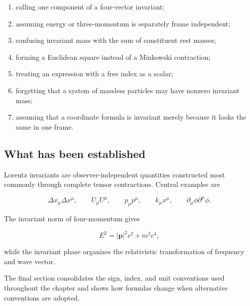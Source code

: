\begin{enumerate}
    \item calling one component of a four-vector invariant;
    \item assuming energy or three-momentum is separately frame independent;
    \item confusing invariant mass with the sum of constituent rest masses;
    \item forming a Euclidean square instead of a Minkowski contraction;
    \item treating an expression with a free index as a scalar;
    \item forgetting that a system of massless particles may have nonzero invariant mass;
    \item assuming that a coordinate formula is invariant merely because it looks the same in one frame.
\end{enumerate}

\subsection{What has been established}

Lorentz invariants are observer-independent quantities constructed most commonly through complete tensor contractions. Central examples are

\[
\Delta x_{\mu}\Delta x^{\mu},
\qquad
U_{\mu}U^{\mu},
\qquad
p_{\mu}p^{\mu},
\qquad
k_{\mu}x^{\mu},
\qquad
\partial_{\mu}\phi\partial^{\mu}\phi.
\]

The invariant norm of four-momentum gives

\[
E^{2}=|\mathbf{p}|^{2}c^{2}+m^{2}c^{4},
\]

while the invariant phase organizes the relativistic transformation of frequency and wave vector.

The final section consolidates the sign, index, and unit conventions used throughout the chapter and shows how formulas change when alternative conventions are adopted.